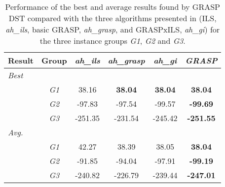 \begin{table}[htbp!]
\centering
    \caption{Performance of the best and average results found by GRASP DST compared with the three algorithms presented in \cite{AitHaddadene2016} (ILS, \emph{ah\_ils}, basic GRASP,  \emph{ah\_grasp}, and GRASPxILS, \emph{ah\_gi}) for the three instance groups \emph{G1}, \emph{G2} and \emph{G3}.}
    \begin{tabular}{cccccc}
    \label{tab:group_table_aith_combined}\\\hline

Result  &   Group   &   \emph{ah\_ils}  &   \emph{ah\_grasp}    &   \emph{ah\_gi}   &   \emph{GRASP}    \\  \hline
\multicolumn{6}{l}{\emph{Best}} \\                                              
    &   \emph{G1}   &   38.16   &   \textbf{38.04}  &   \textbf{38.04}  &   \textbf{38.04}  \\  
    &   \emph{G2}   &   -97.83  &   -97.54  &   -99.57  &   \textbf{-99.69} \\  
    &   \emph{G3}   &   -251.35 &   -231.54 &   -245.42 &   \textbf{-251.55}    \\  
\multicolumn{6}{l}{\emph{Avg.}} \\                                              
    &   \emph{G1}   &   42.27   &   38.39   &   38.05   &   \textbf{38.04}  \\  
    &   \emph{G2}   &   -91.85  &   -94.04  &   -97.91  &   \textbf{-99.19} \\  
    &   \emph{G3}   &   -240.82 &   -226.79 &   -239.44 &   \textbf{-247.01}    \\  
    \hline
    \end{tabular}
\end{table}